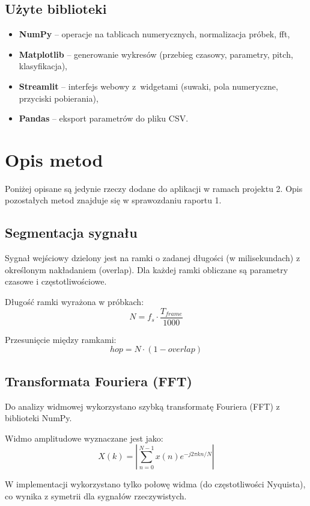 \documentclass[a4paper,12pt]{article}
\begin{document}
\subsection{U\.zyte biblioteki}

\begin{itemize}
	\item \textbf{NumPy} -- operacje na tablicach numerycznych,
	normalizacja pr\'obek, fft,
	\item \textbf{Matplotlib} -- generowanie wykres\'ow (przebieg
	czasowy, parametry, pitch, klasyfikacja),
	\item \textbf{Streamlit} -- interfejs webowy z~widgetami (suwaki,
	pola numeryczne, przyciski pobierania),
	\item \textbf{Pandas} -- eksport parametr\'ow do pliku CSV.
\end{itemize}

\section{Opis metod}
Poniżej opisane są jedynie rzeczy dodane do aplikacji w ramach  projektu 2. Opis pozostałych metod znajduje się w sprawozdaniu raportu 1.

\subsection{Segmentacja sygnału}

Sygnał wejściowy dzielony jest na ramki o zadanej długości (w milisekundach) z określonym nakładaniem (overlap). Dla każdej ramki obliczane są parametry czasowe i częstotliwościowe.

Długość ramki wyrażona w próbkach:
\[
N = f_s \cdot \frac{T_{frame}}{1000}
\]

Przesunięcie między ramkami:
\[
hop = N \cdot (1 - overlap)
\]

\subsection{Transformata Fouriera (FFT)}

Do analizy widmowej wykorzystano szybką transformatę Fouriera (FFT) z biblioteki NumPy.

Widmo amplitudowe wyznaczane jest jako:
\[
X(k) = \left| \sum_{n=0}^{N-1} x(n) e^{-j 2\pi kn/N} \right|
\]

W implementacji wykorzystano tylko połowę widma (do częstotliwości Nyquista), co wynika z symetrii dla sygnałów rzeczywistych.
\end{document}
